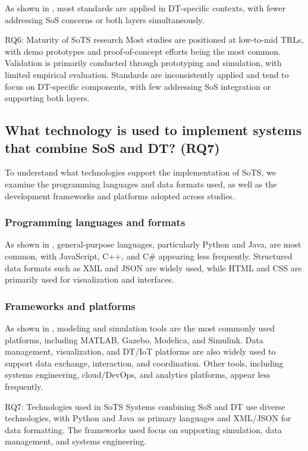 
As shown in , most standards are applied in DT-specific contexts, with fewer addressing SoS concerns or both layers simultaneously.

\begin{conclusionframe}{RQ6: Maturity of SoTS research}
Most studies are positioned at low-to-mid TRLs, with demo prototypes and proof-of-concept efforts being the most common. Validation is primarily conducted through prototyping and simulation, with limited empirical evaluation. Standards are inconsistently applied and tend to focus on DT-specific components, with few addressing SoS integration or supporting both layers.
\end{conclusionframe}


\subsection{What technology is used to implement systems that combine SoS and DT? (RQ7)}\label{results-rq7}

To understand what technologies support the implementation of SoTS, we examine the programming languages and data formats used, as well as the development frameworks and platforms adopted across studies.

\subsubsection{Programming languages and formats}\label{sec:programming-languages}
 
As shown in , general-purpose languages, particularly Python and Java, are most common, with JavaScript, C++, and C\# appearing less frequently. Structured data formats such as XML and JSON are widely used, while HTML and CSS are primarily used for visualization and interfaces.

\subsubsection{Frameworks and platforms}\label{sec:frameworks}

As shown in , modeling and simulation tools are the most commonly used platforms, including MATLAB, Gazebo, Modelica, and Simulink. Data management, visualization, and DT/IoT platforms are also widely used to support data exchange, interaction, and coordination. Other tools, including systems engineering, cloud/DevOps, and analytics platforms, appear less frequently.

\begin{conclusionframe}{RQ7: Technologies used in SoTS}
Systems combining SoS and DT use diverse technologies, with Python and Java as primary languages and XML/JSON for data formatting. The frameworks used focus on supporting simulation, data management, and systems engineering.
\end{conclusionframe}